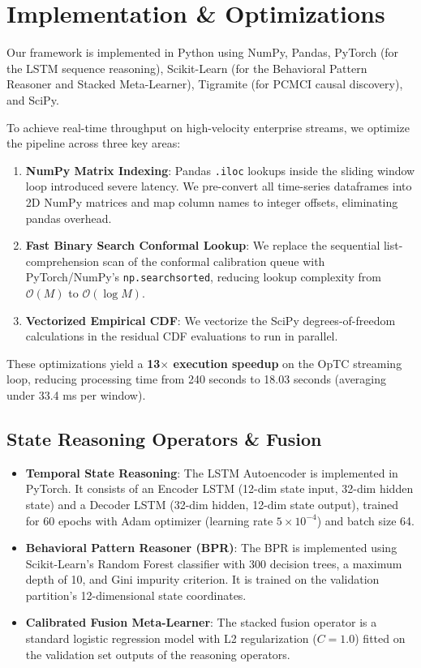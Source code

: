\section{Implementation \& Optimizations}

Our framework is implemented in Python using NumPy, Pandas, PyTorch (for the LSTM sequence reasoning), Scikit-Learn (for the Behavioral Pattern Reasoner and Stacked Meta-Learner), Tigramite (for PCMCI causal discovery), and SciPy. 

To achieve real-time throughput on high-velocity enterprise streams, we optimize the pipeline across three key areas:
\begin{enumerate}
\item \textbf{NumPy Matrix Indexing}: Pandas \texttt{.iloc} lookups inside the sliding window loop introduced severe latency. We pre-convert all time-series dataframes into 2D NumPy matrices and map column names to integer offsets, eliminating pandas overhead.
\item \textbf{Fast Binary Search Conformal Lookup}: We replace the sequential list-comprehension scan of the conformal calibration queue with PyTorch/NumPy's \texttt{np.searchsorted}, reducing lookup complexity from $\mathcal{O}(M)$ to $\mathcal{O}(\log M)$.
\item \textbf{Vectorized Empirical CDF}: We vectorize the SciPy degrees-of-freedom calculations in the residual CDF evaluations to run in parallel.
\end{enumerate}

These optimizations yield a \textbf{13$\times$ execution speedup} on the OpTC streaming loop, reducing processing time from 240 seconds to 18.03 seconds (averaging under 33.4 ms per window).

\subsection{State Reasoning Operators \& Fusion}
\begin{itemize}
\item \textbf{Temporal State Reasoning}: The LSTM Autoencoder is implemented in PyTorch. It consists of an Encoder LSTM (12-dim state input, 32-dim hidden state) and a Decoder LSTM (32-dim hidden, 12-dim state output), trained for 60 epochs with Adam optimizer (learning rate $5\times 10^{-4}$) and batch size 64. 
\item \textbf{Behavioral Pattern Reasoner (BPR)}: The BPR is implemented using Scikit-Learn's Random Forest classifier with 300 decision trees, a maximum depth of 10, and Gini impurity criterion. It is trained on the validation partition's 12-dimensional state coordinates.
\item \textbf{Calibrated Fusion Meta-Learner}: The stacked fusion operator is a standard logistic regression model with L2 regularization ($C=1.0$) fitted on the validation set outputs of the reasoning operators.
\end{itemize}

